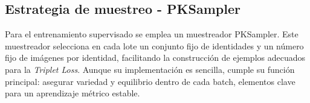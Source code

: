 \subsection{Estrategia de muestreo - PKSampler}

Para el entrenamiento supervisado se emplea un muestreador PKSampler. Este muestreador selecciona en cada lote un conjunto fijo de identidades y un número fijo de imágenes por identidad, facilitando la construcción de ejemplos adecuados para la \textit{Triplet Loss}. Aunque su implementación es sencilla, cumple su función principal: asegurar variedad y equilibrio dentro de cada batch, elementos clave para un aprendizaje métrico estable.

